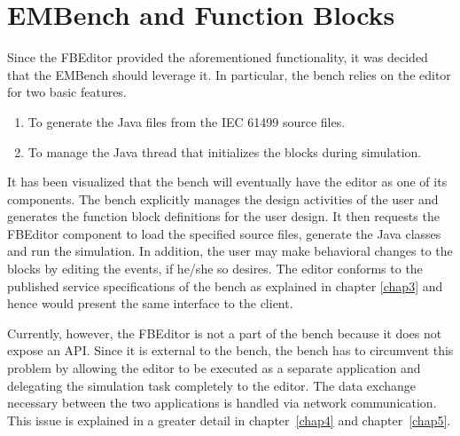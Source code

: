 \section{EMBench and Function Blocks}

Since the FBEditor provided the aforementioned functionality, it
was decided that the EMBench should leverage it. In particular,
the bench relies on the editor for two basic features.
\begin{enumerate}
\item To generate the Java files from the IEC 61499 source files.
\item To manage the Java thread that initializes the blocks during
simulation.
\end{enumerate}

It has been visualized that the bench will eventually have the
editor as one of its components. The bench explicitly manages the
design activities of the user and generates the function block
definitions for the user design. It then requests the FBEditor
component to load the specified source files, generate the Java
classes and run the simulation. In addition, the user may make
behavioral changes to the blocks by editing the events, if he/she
so desires. The editor conforms to the published service
specifications of the bench as explained in chapter \ref{chap3}
and hence would present the same interface to the client.

Currently, however, the FBEditor is not a part of the bench
because it does not expose an API. Since it is external to the
bench, the bench has to circumvent this problem by allowing the
editor to be executed as a separate application and delegating the
simulation task completely to the editor. The data exchange
necessary between the two applications is handled via network
communication. This issue is explained in a greater detail in
chapter~\ref{chap4} and chapter~\ref{chap5}.
